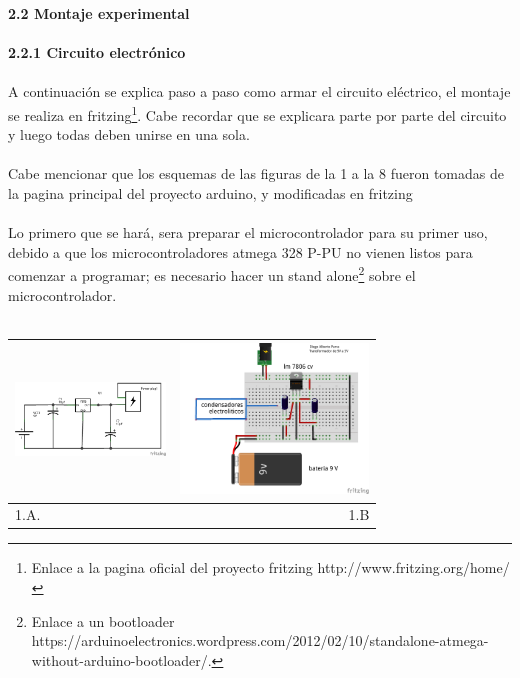 \documentclass[12]{article}
\newenvironment{Figure}
{\par\medskip\noindent\minipage{\linewidth}}
{\endminipage\par\medskip}
\begin{document}
\begin{multicols}{2}
{\bf{2.2 Montaje experimental}}\\\\
{\bf{2.2.1 Circuito electrónico}}\\\\
A continuación se explica paso a paso como armar el circuito eléctrico, el montaje se realiza en fritzing\footnote{Enlace a la pagina oficial del proyecto fritzing http://www.fritzing.org/home/}. Cabe recordar que se explicara parte por parte del circuito y luego todas deben unirse en una sola.\\\\
Cabe mencionar que los esquemas de las figuras de la 1 a la 8 fueron tomadas de la pagina principal del proyecto arduino\cite{ARDUINO}, y modificadas en fritzing\cite{FRITZING}  \\\\
Lo primero que se hará, sera preparar el microcontrolador para su primer uso, debido a que los microcontroladores atmega 328 P-PU no vienen listos para comenzar a programar; es necesario hacer un stand alone\footnote{Enlace a un bootloader https://arduinoelectronics.wordpress.com/2012/02/10/standalone-atmega-without-arduino-bootloader/.} sobre el microcontrolador.\\\\


\begin{Figure}
\center
\begin{tabular}{|l|r|}
\hline
\includegraphics[width=4cm, height=4cm]{img/esquematrans.png}  & \includegraphics[width=4.cm, height=4cm]{img/montajetr5V.png} \\ \hline
1.A. & 1.B \\ \hline
\end{tabular}
\label{fig:g1}
\end{Figure}
\vspace{0.2cm}


\end{multicols}
\end{document}
